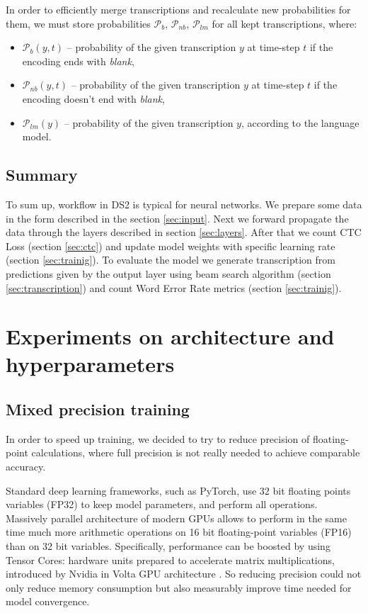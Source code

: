 \documentclass[licencjacka,en]{pracamgr}
\begin{document}
	In order to efficiently merge transcriptions and recalculate new probabilities for them, we must store probabilities $\mathcal{P}_{b}$, $\mathcal{P}_{nb}$, $\mathcal{P}_{lm}$ for all kept transcriptions, where:
	\begin{itemize}
		\item $\mathcal{P}_{b}(y, t)$ -- probability of the given transcription $y$ at time-step $t$ if the encoding ends with \textit{blank},
		\item $\mathcal{P}_{nb}(y, t)$ -- probability of the given transcription $y$ at time-step $t$ if the encoding doesn't end with \textit{blank},
		\item $\mathcal{P}_{lm}(y)$ -- probability of the given transcription $y$, according to the language model.\\
	\end{itemize}
	
	\section{Summary}
	To sum up, workflow in DS2 is typical for neural networks. We prepare some data in the form described in the section \ref{sec:input}. Next we forward propagate the data through the layers described in section \ref{sec:layers}. After that we count CTC Loss (section \ref{sec:ctc}) and update model weights with specific learning rate (section \ref{sec:trainig}). To evaluate the model we generate transcription from predictions given by the output layer using beam search algorithm (section \ref{sec:transcription}) and count Word Error Rate metrics (section \ref{sec:trainig}).
	
	
	\chapter{Experiments on architecture and hyperparameters}\label{r:experiments}
	
	\section{Mixed precision training}
	In order to speed up training, we decided to try to reduce precision of floating-point calculations, where full precision is not really needed to achieve comparable accuracy.
	
	Standard deep learning frameworks, such as PyTorch, use 32 bit floating points variables (FP32) to keep model parameters, and perform all operations. Massively parallel architecture of modern GPUs allows to perform in the same time much more arithmetic operations on 16 bit floating-point variables (FP16) than on 32 bit variables.
	Specifically, performance can be boosted by using Tensor Cores: hardware units prepared to accelerate matrix multiplications, introduced by Nvidia in Volta GPU architecture \cite{MPT}.
	So reducing precision could not only reduce memory consumption but also measurably improve time needed for model convergence.
	
\end{document}
